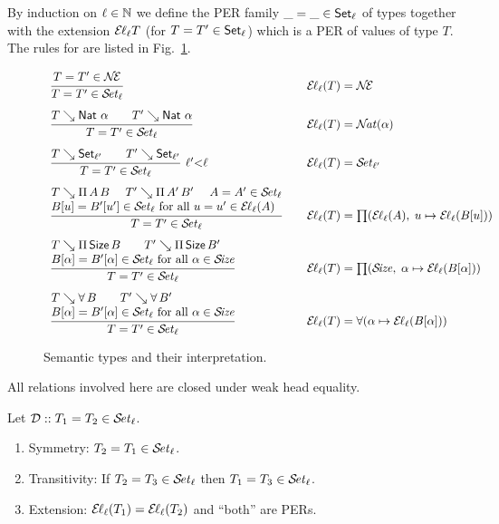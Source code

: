 \documentclass[acmsmall%
]{acmart}\settopmatter{printfolios=true}
\newcommand{\LONGVERSION}[1]{}
\begin{document}
By induction on $\ell \in \NN$ we define the PER family
$\_ = \_ \in \Set[\ell]$ of types
together with the extension $\EL[\ell] T$ (for $T = T' \in \Set[\ell]$)
which is a PER of values of type $T$.
The rules for  are listed in Fig.~\ref{fig:per}.
\begin{figure}
\hrulefill
\[
\begin{array}{l@{\qquad}l}
  \ru{%
      T = T' \in \NEE
    }{T = T' \in \SET[\ell]}
  & \EL[\ell](T) = \NEE
\\[3ex]
  \ru{T \evalsto \Nat\,\alpha \qquad T' \evalsto \Nat\,\alpha
    }{T = T' \in \SET[\ell]}
  & \EL[\ell](T) = \NAT(\alpha)
\\[3ex]
  \rux{T \evalsto \Set[\ell'] \qquad T' \evalsto \Set[\ell']
     }{T = T' \in \SET[\ell]
     }{\ell'{<}\ell}
  & \EL[\ell](T) = \SET[\ell']
\\[3ex]
  \rul{T \evalsto \piT A B \quad \
      T' \evalsto \piT{A'}{B'} \quad \
      A = A' \in \SET[\ell] \\
      B[u] = B'[u'] \in \SET[\ell] \mforall u = u' \in \EL[\ell](A)
    }{T = T' \in \SET[\ell]}
  & \EL[\ell](T) = \PI(\EL[\ell](A),\;u \mapsto \EL[\ell](B[u]))
\\[3ex]
  \rul{T \evalsto \piT \Size B \qquad
      T' \evalsto \piT{\Size}{B'} \\
      B[\alpha] = B'[\alpha] \in \SET[\ell] \mforall \alpha \in \SIZE
    }{T = T' \in \SET[\ell]}
  & \EL[\ell](T) = \PI(\SIZE,\; \alpha \mapsto \EL[\ell](B[\alpha]))
\\[3ex]
  \rul{T \evalsto \forallT B \qquad
      T' \evalsto \forallT{B'} \\
      B[\alpha] = B'[\alpha] \in \SET[\ell] \mforall \alpha \in \SIZE
    }{T = T' \in \SET[\ell]}
  & \EL[\ell](T) = \FORALL(\alpha \mapsto \EL[\ell](B[\alpha]))
\end{array}
\]
\hrulefill
\caption{Semantic types and their interpretation.\label{fig:per}}
\end{figure}
All relations involved here are closed under weak head equality.
\begin{lemma}[Well-definedness]
  Let $\DD :: T_1 = T_2 \in \SET[\ell]$.
  \begin{enumerate}
  \item Symmetry: $T_2 = T_1 \in \SET[\ell]$.
  \item Transitivity: If\/ $T_2 = T_3 \in \SET[\ell]$ then $T_1 = T_3 \in \SET[\ell]$.
  \item Extension: $\EL[\ell](T_1) = \EL[\ell](T_2)$ and ``both'' are PERs.
  \end{enumerate}
\end{lemma}
\LONGVERSION{
\begin{proof}
  Simultaneously by induction on $\DD$.
\end{proof}
}
\end{document}
